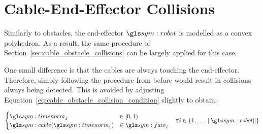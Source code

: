 \section{Cable-End-Effector Collisions}%
\label{sec:cable_end_effector_collisions}

	Similarly to obstacles, the end-effector $\robot$ is modelled as a convex
	polyhedron. As a result, the same procedure of
	Section~\ref{sec:cable_obstacle_collisions} can be largely applied for this
	case.

	One small difference is that the cables are always touching the
	end-effector. Therefore, simply following the procedure from before would
	result in collisions always being detected. This is avoided by adjusting
	Equation~\ref{eq:cable_obstacle_collision_condition} slightly to obtain:

	\begin{equation}
		\begin{cases}
			\timenorm_1 &\in [0, 1)\\
			\cable(\timenorm_1) &\in \face_i
		\end{cases}
		\quad \forall i \in \{1, \ldots, \norm{\robot}\}
		\label{eq:cable_robot_collision_condition}
	\end{equation}
